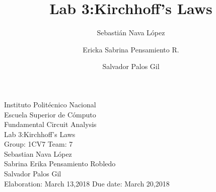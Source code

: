 \documentclass[a4paper]{article}
\title{Lab 3:Kirchhoff's Laws}
\author{
    Sebastián Nava López\\
    \and
    Ericka Sabrina Pensamiento R.\\
    \and
    Salvador Palos Gil
}
\begin{document}
\begin{titlepage}
    \centering
    {\Huge Instituto Politécnico Nacional}\\[3ex]
    {\huge Escuela Superior de Cómputo}\\[8ex]
    {\huge Fundamental Circuit Analysis}\\[12ex]
    {\Large Lab 3:Kirchhoff's Laws}\\[20ex]
    {\Large Group: 1CV7 Team: 7 \\[8ex]
    Sebastian Nava López\\[4ex]
    Sabrina Erika Pensamiento Robledo\\[4ex]
    Salvador Palos Gil\\[18ex]
    }
    \large{Elaboration: March 13,2018\hspace{8em} Due date: March 20,2018}
\end{titlepage}
\tableofcontents
\newpage
\end{document}
